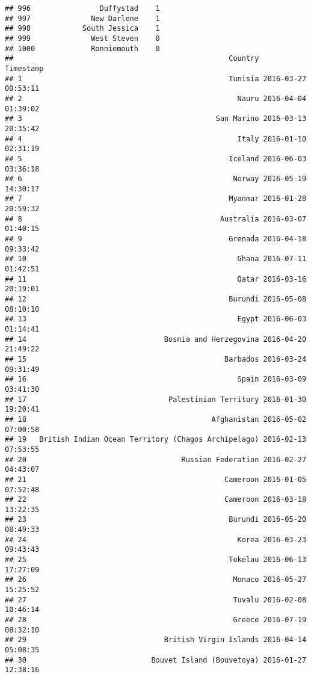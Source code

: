 \documentclass[
]{article}
\begin{document}
\begin{verbatim}
## 996                Duffystad    1
## 997              New Darlene    1
## 998            South Jessica    1
## 999              West Steven    0
## 1000             Ronniemouth    0
##                                                  Country           Timestamp
## 1                                                Tunisia 2016-03-27 00:53:11
## 2                                                  Nauru 2016-04-04 01:39:02
## 3                                             San Marino 2016-03-13 20:35:42
## 4                                                  Italy 2016-01-10 02:31:19
## 5                                                Iceland 2016-06-03 03:36:18
## 6                                                 Norway 2016-05-19 14:30:17
## 7                                                Myanmar 2016-01-28 20:59:32
## 8                                              Australia 2016-03-07 01:40:15
## 9                                                Grenada 2016-04-18 09:33:42
## 10                                                 Ghana 2016-07-11 01:42:51
## 11                                                 Qatar 2016-03-16 20:19:01
## 12                                               Burundi 2016-05-08 08:10:10
## 13                                                 Egypt 2016-06-03 01:14:41
## 14                                Bosnia and Herzegovina 2016-04-20 21:49:22
## 15                                              Barbados 2016-03-24 09:31:49
## 16                                                 Spain 2016-03-09 03:41:30
## 17                                 Palestinian Territory 2016-01-30 19:20:41
## 18                                           Afghanistan 2016-05-02 07:00:58
## 19   British Indian Ocean Territory (Chagos Archipelago) 2016-02-13 07:53:55
## 20                                    Russian Federation 2016-02-27 04:43:07
## 21                                              Cameroon 2016-01-05 07:52:48
## 22                                              Cameroon 2016-03-18 13:22:35
## 23                                               Burundi 2016-05-20 08:49:33
## 24                                                 Korea 2016-03-23 09:43:43
## 25                                               Tokelau 2016-06-13 17:27:09
## 26                                                Monaco 2016-05-27 15:25:52
## 27                                                Tuvalu 2016-02-08 10:46:14
## 28                                                Greece 2016-07-19 08:32:10
## 29                                British Virgin Islands 2016-04-14 05:08:35
## 30                             Bouvet Island (Bouvetoya) 2016-01-27 12:38:16

\end{verbatim}
\end{document}
